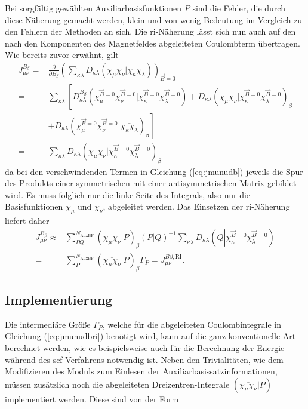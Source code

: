 	Bei sorgfältig gewählten Auxiliarbasisfunktionen $P$ sind die Fehler, die durch diese Näherung gemacht werden, klein und von wenig Bedeutung\supercite{eichkorn1995auxiliary} im Vergleich zu den Fehlern der Methoden an sich. Die \ac{ri}-Näherung lässt sich nun auch auf den nach den Komponenten des Magnetfeldes abgeleiteten Coulombterm übertragen. Wie bereits zuvor erwähnt, gilt
	\begin{equation}\label{eq:jmunudb}
	\begin{aligned}
	J_{\mu\nu}^{B_\beta}=&\frac{\partial}{\partial B_\beta}\left(\sum_{\kappa\lambda}D_{\kappa\lambda}\left(\chi_\mu\chi_\nu\vert\chi_\kappa\chi_\lambda\right)\right)_{\vec{B}=0}\\
	=&\sum_{\kappa\lambda}\left[D_{\kappa\lambda}^{B_\beta}\left(\chi_\mu^{\vec{B}=0}\chi_\nu^{\vec{B}=0}\vert\chi_\kappa^{\vec{B}=0}\chi_\lambda^{\vec{B}=0}\right)+D_{\kappa\lambda}\left(\overline{\chi_\mu\chi_\nu}\vert\chi_\kappa^{\vec{B}=0}\chi_\lambda^{\vec{B}=0}\right)_{\beta}\right.\\
    &+\left.D_{\kappa\lambda}\left(\chi_\mu^{\vec{B}=0}\chi_\nu^{\vec{B}=0}\vert\overline{\chi_\kappa\chi_\lambda}\right)_{\beta}\right]\\
    =&\sum_{\kappa\lambda}D_{\kappa\lambda}\left(\overline{\chi_\mu\chi_\nu}\vert\chi_\kappa^{\vec{B}=0}\chi_\lambda^{\vec{B}=0}\right)_{\beta}
	\end{aligned}
	\end{equation}
	da bei den verschwindenden Termen in Gleichung (\ref{eq:jmunudb}) jeweils die Spur des Produkts einer symmetrischen mit einer antisymmetrischen Matrix gebildet wird. Es muss folglich nur die linke Seite des Integrals, also nur die Basisfunktionen $\chi_\mu$ und $\chi_\nu$, abgeleitet werden. Das Einsetzen der \ac{ri}-Näherung liefert daher
	\begin{equation}\label{eq:jmunudbri}
	\begin{aligned}
	J_{\mu\nu}^{B_\beta}\approx &\sum_{PQ}^{N_{\textrm{AuxBF}}}\left(\overline{\chi_\mu\chi_\nu}\vert P\right)_\beta\left(P\vert Q\right)^{-1}\sum_{\kappa\lambda}D_{\kappa\lambda}\left(Q\left\vert\chi_\kappa^{\vec{B}=0}\chi_\lambda^{\vec{B}=0}\right.\right)\\
	=&\sum_{P}^{N_{\textrm{AuxBF}}}\left(\overline{\chi_\mu\chi_\nu}\vert P\right)_\beta\Gamma_P=J_{\mu\nu}^{B\beta ,\textrm{RI}}.
	\end{aligned}
	\end{equation}
	\subsection{Implementierung}
	Die intermediäre Größe $\Gamma_P$, welche für die abgeleiteten Coulombintegrale in Gleichung (\ref{eq:jmunudbri}) benötigt wird, kann auf die ganz konventionelle Art berechnet werden, wie es beispielsweise auch für die Berechnung der Energie während des \ac{scf}-Verfahrens notwendig ist. Neben den Trivialitäten, wie dem Modifizieren des Moduls zum Einlesen der Auxiliarbasissatzinformationen, müssen zusätzlich noch die abgeleiteten Dreizentren-Integrale $\left(\overline{\chi_\mu\chi_\nu}\vert P\right)$ implementiert werden. Diese sind von der Form
	
